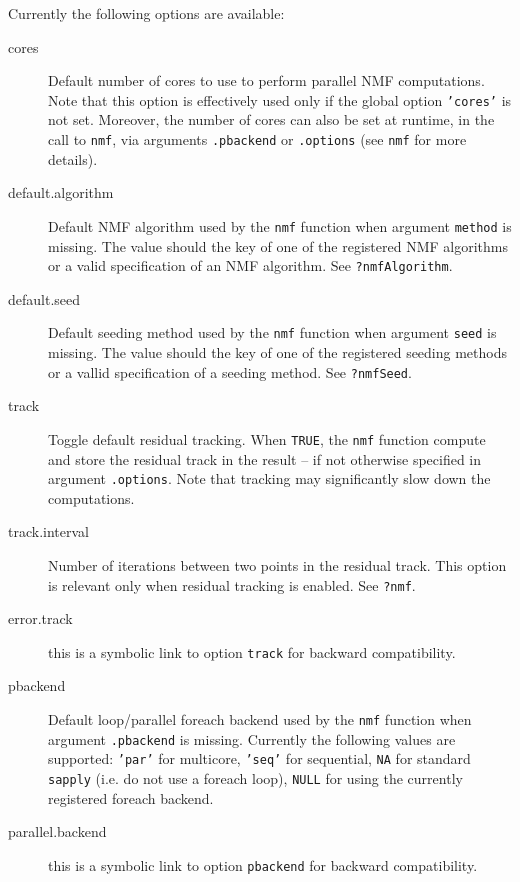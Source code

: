 \documentclass[a4paper]{article}\usepackage[]{graphicx}\usepackage[]{color}
\let\code=\texttt
\begin{document}
Currently the following options are available:


\begin{description}


\item[cores] Default number of cores to use to perform parallel NMF computations.
Note that this option is effectively used only if the global option \code{'cores'} is
not set.
Moreover, the number of cores can also be set at runtime, in the call to \code{nmf},
via arguments \code{.pbackend} or \code{.options} (see \code{nmf} for more details).

\item[default.algorithm] Default NMF algorithm used by the \code{nmf} function when argument
\code{method} is missing.
The value should the key of one of the registered NMF algorithms or a valid specification of an NMF algorithm.
See \code{?nmfAlgorithm}.

\item[default.seed] Default seeding method used by the \code{nmf} function when argument \code{seed} is missing.
The value should the key of one of the registered seeding methods or a vallid specification of a seeding method.
See \code{?nmfSeed}.

\item[track] Toggle default residual tracking.
When \code{TRUE}, the \code{nmf} function compute and store the residual track in the result -- if not otherwise specified in argument \code{.options}.
Note that tracking may significantly slow down the computations.

\item[track.interval] Number of iterations between two points in the residual track.
This option is relevant only when residual tracking is enabled.
See \code{?nmf}.

\item[error.track] this is a symbolic link to option \code{track} for backward compatibility.

\item[pbackend] Default loop/parallel foreach backend used by the \code{nmf} function when
argument \code{.pbackend} is missing.
Currently the following values are supported: \code{'par'} for multicore,
\code{'seq'} for sequential, \code{NA} for standard \code{sapply} (i.e. do not use a foreach loop),
\code{NULL} for using the currently registered foreach backend.

\item[parallel.backend] this is a symbolic link to option \code{pbackend} for backward compatibility.


\end{description}
\end{document}
